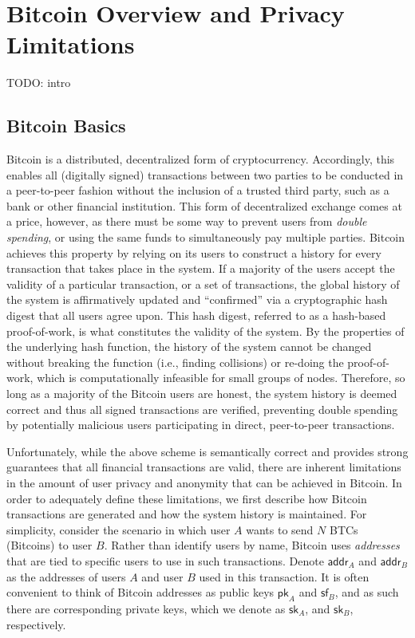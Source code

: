 \section{Bitcoin Overview and Privacy Limitations}

TODO: intro

\subsection{Bitcoin Basics}

Bitcoin is a distributed, decentralized form of cryptocurrency. Accordingly, this enables all (digitally signed) transactions between two parties to be conducted in a peer-to-peer fashion without the inclusion of a trusted third party, such as a bank or other financial institution. This form of decentralized exchange comes at a price, however, as there must be some way to prevent users from \emph{double spending}, or using the same funds to simultaneously pay multiple parties. Bitcoin achieves this property by relying on its users to construct a history for every transaction that takes place in the system. If a majority of the users accept the validity of a particular transaction, or a set of transactions, the global history of the system is affirmatively updated and ``confirmed'' via a cryptographic hash digest that all users agree upon. This hash digest, referred to as a hash-based proof-of-work, is what constitutes the validity of the system. By the properties of the underlying hash function, the history of the system cannot be changed without breaking the function (i.e., finding collisions) or re-doing the proof-of-work, which is computationally infeasible for small groups of nodes. Therefore, so long as a majority of the Bitcoin users are honest, the system history is deemed correct and thus all signed transactions are verified, preventing double spending by potentially malicious users participating in direct, peer-to-peer transactions. 

Unfortunately, while the above scheme is semantically correct and provides strong guarantees that all financial transactions are valid, there are inherent limitations in the amount of user privacy and anonymity that can be achieved in Bitcoin. In order to adequately define these limitations, we first describe how Bitcoin transactions are generated and how the system history is maintained. For simplicity, consider the scenario in which user $A$ wants to send $N$ BTCs (Bitcoins) to user $B$. Rather than identify users by name, Bitcoin uses \emph{addresses} that are tied to specific users to use in such transactions. Denote $\mathsf{addr}_A$ and $\mathsf{addr}_B$ as the addresses of users $A$ and user $B$ used in this transaction. It is often convenient to think of Bitcoin addresses as public keys $\mathsf{pk}_A$ and $\mathsf{sf}_B$, and as such there are corresponding private keys, which we denote as $\mathsf{sk}_A$, and $\mathsf{sk}_B$, respectively.

